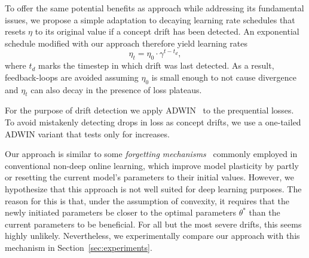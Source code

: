 \documentclass[letterpaper]{article} %
\begin{document}
To offer the same potential benefits as \citet{kunchevaAdaptiveLearningRate2008} approach while addressing its fundamental issues, we propose a simple adaptation to decaying learning rate schedules that resets $\eta$ to its original value if a concept drift has been detected.
An exponential schedule modified with our approach therefore yield learning rates
\begin{equation}
	\eta_t = \eta_0 \cdot \gamma^{t-t_d},
\end{equation}\label{eq:drift_reset}
where $t_d$ marks the timestep in which drift was last detected.
As a result, feedback-loops are avoided assuming $\eta_0$ is small enough to not cause divergence and $\eta_t$ can also decay in the presence of loss plateaus.

For the purpose of drift detection we apply ADWIN~\cite{bifetLearningTimeChangingData2007} to the prequential losses.
To avoid mistakenly detecting drops in loss as concept drifts, we use a one-tailed ADWIN variant that tests only for increases.


Our approach is similar to some \textit{forgetting mechanisms}~\cite{gamaSurveyConceptDrift2014} commonly employed in conventional non-deep online learning, which improve model plasticity by partly~\cite{bifetAdaptiveLearningEvolving2009} or resetting the current model's parameters to their initial values.
However, we hypothesize that this approach is not well suited for deep learning purposes.
The reason for this is that, under the assumption of convexity, it requires that the newly initiated parameters be closer to the optimal parameters $\theta^*$ than the current parameters to be beneficial.
For all but the most severe drifts, this seems highly unlikely.
Nevertheless, we experimentally compare our approach with this mechanism in Section~\ref{sec:experiments}.
\end{document}
